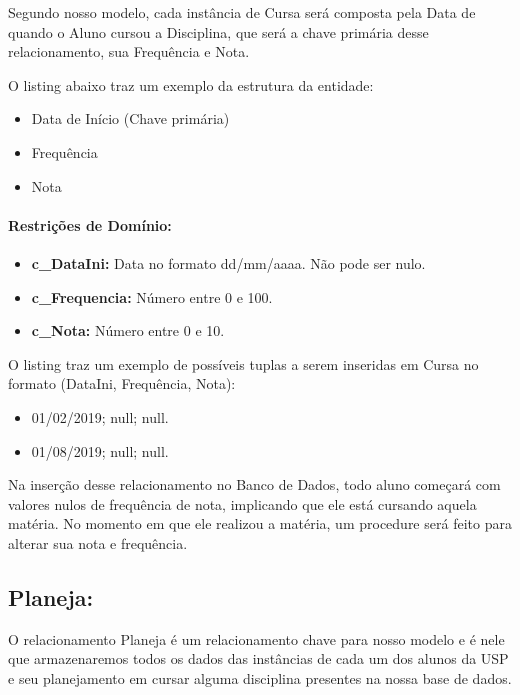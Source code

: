 \documentclass{report}
\begin{document}
	Segundo nosso modelo, cada instância de Cursa será composta pela Data de quando o Aluno cursou a Disciplina, que será a chave primária desse relacionamento, sua Frequência e Nota.
	
	O listing abaixo traz um exemplo da estrutura da entidade:
\begin{itemize}
  \item Data de Início (Chave primária)
  \item Frequência
  \item Nota
\end{itemize}
\paragraph{Restrições de Domínio:}
\begin{itemize}
  \item \textbf{c\_DataIni:} Data no formato dd/mm/aaaa. Não pode ser nulo.
  \item \textbf{c\_Frequencia:} Número entre 0 e 100.
  \item \textbf{c\_Nota:} Número entre 0 e 10.
\end{itemize}
O listing traz um exemplo de possíveis tuplas a serem inseridas em Cursa no formato (DataIni, Frequência, Nota):

\begin{itemize}
	\item 01/02/2019; null; null.
	\item 01/08/2019; null; null.
\end{itemize}
Na inserção desse relacionamento no Banco de Dados, todo aluno começará com valores nulos de frequência de nota, implicando que ele está cursando aquela matéria. No momento em que ele realizou a matéria, um procedure será feito para alterar sua nota e frequência.
\subsection{Planeja:}
O relacionamento Planeja é um relacionamento chave para nosso modelo e é nele que armazenaremos todos os dados das instâncias de cada um dos alunos da USP e seu planejamento em cursar alguma disciplina presentes na nossa base de dados.
	
\end{document}
